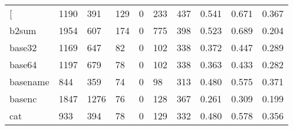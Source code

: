\begin{longtable}{lp{1.3cm}p{1.3cm}p{1.3cm}p{1.3cm}p{1.3cm}p{1.3cm}p{1.3cm}p{1.3cm}p{1.3cm}}
\bottomrule
\endlastfoot
{[}         &                   1190 &                                391 &                               129 &                                0 &                               233 &                             437 &                                   0.541 &                                  0.671 &                                0.367 \\
b2sum     &                   1954 &                                607 &                               174 &                                0 &                               775 &                             398 &                                   0.523 &                                  0.689 &                                0.204 \\
base32    &                   1169 &                                647 &                                82 &                                0 &                               102 &                             338 &                                   0.372 &                                  0.447 &                                0.289 \\
base64    &                   1197 &                                679 &                                78 &                                0 &                               102 &                             338 &                                   0.363 &                                  0.433 &                                0.282 \\
basename  &                    844 &                                359 &                                74 &                                0 &                                98 &                             313 &                                   0.480 &                                  0.575 &                                0.371 \\
basenc    &                   1847 &                               1276 &                                76 &                                0 &                               128 &                             367 &                                   0.261 &                                  0.309 &                                0.199 \\
cat       &                    933 &                                394 &                                78 &                                0 &                               129 &                             332 &                                   0.480 &                                  0.578 &                                0.356 \\

\end{longtable}

